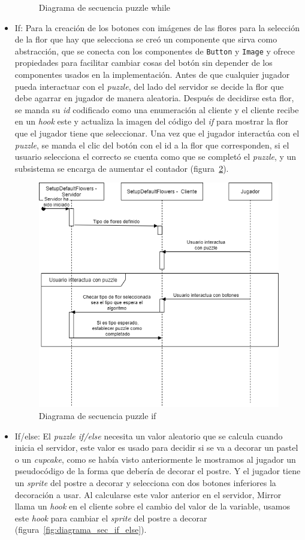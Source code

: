 \begin{itemize}
\begin{figure}[H]
        \caption{Diagrama de secuencia puzzle while}
        \label{fig:diagrama_sec_while}
    \end{figure}
    \item If: Para la creación de los botones con imágenes de las flores para la selección de la flor que hay que selecciona se creó un componente que sirva como abstracción, que se conecta con los componentes de \texttt{Button} y \texttt{Image} y ofrece propiedades para facilitar cambiar cosas del botón sin depender de los componentes usados en la implementación. 
    Antes de que cualquier jugador pueda interactuar con el \textit{puzzle}, del lado del servidor se decide la flor que debe agarrar en jugador de manera aleatoria. Después de decidirse esta flor, se manda su \textit{id} codificado como una enumeración al cliente y el cliente recibe en un \textit{hook} este y actualiza la imagen del código del \textit{if} para mostrar la flor que el jugador tiene que seleccionar. 
    Una vez que el jugador interactúa con el \textit{puzzle}, se manda el clic del botón con el id a la flor que corresponden, si el usuario selecciona el correcto se cuenta como que se completó el \textit{puzzle}, y un subsistema se encarga de aumentar el contador (figura~\ref{fig:diagrama_sec_if}).
    \begin{figure}[H]
        \centering
        \includegraphics[width=0.8\linewidth]{images/DiagramaSecuenciaPuzzleIf.png}
        \caption{Diagrama de secuencia puzzle if}
        \label{fig:diagrama_sec_if}
    \end{figure}
    \item If/else: El \textit{puzzle if/else} necesita un valor aleatorio que se calcula cuando inicia el servidor, este valor es usado para decidir si se va a decorar un pastel o un \textit{cupcake}, como se había visto anteriormente le mostramos al jugador un pseudocódigo de la forma que debería de decorar el postre. Y el jugador tiene un \textit{sprite} del postre a decorar y selecciona con dos botones inferiores la decoración a usar. Al calcularse este valor anterior en el servidor, Mirror llama un \textit{hook} en el cliente sobre el cambio del valor de la variable, usamos este \textit{hook} para cambiar el \textit{sprite} del postre a decorar (figura~\ref{fig:diagrama_sec_if_else}).

\end{itemize}
